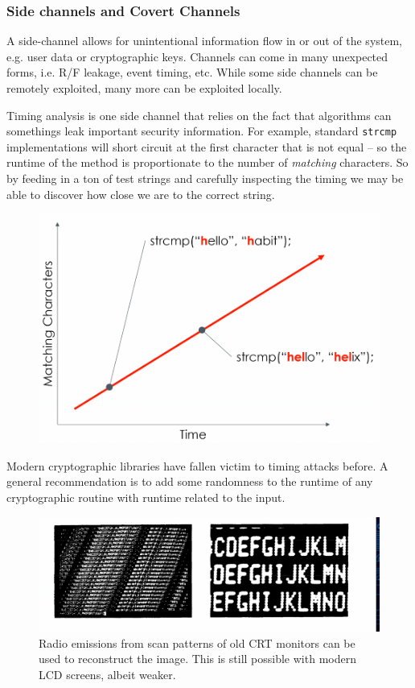 \documentclass[../notes.tex]{subfiles}
\begin{document}
\subsubsection{Side channels and Covert Channels}

\begin{definition}
    A side-channel allows for unintentional information flow in or out of the system, e.g. user data or cryptographic keys.
    Channels can come in many unexpected forms, i.e. R/F leakage, event timing, etc.
    While some side channels can be remotely exploited, many more can be exploited locally.
\end{definition}

Timing analysis is one side channel that relies on the fact that algorithms can somethings leak important security information.
For example, standard \texttt{strcmp} implementations will short circuit at the first character that is not equal -- so the runtime of the method is proportionate to the number of \textit{matching} characters.
So by feeding in a ton of test strings and carefully inspecting the timing we may be able to discover how close we are to the correct string.

\begin{figure}[H]
    \centering
    \includegraphics[width=0.8\linewidth]{img/image_2023-03-28-15-37-17.png}
\end{figure}

Modern cryptographic libraries have fallen victim to timing attacks before. A general recommendation is to add some randomness to the runtime of any cryptographic routine with runtime related to the input.

\begin{figure}[H]
    \centering
    \includegraphics[width=0.8\linewidth]{img/image_2023-03-28-15-44-01.png}
    \caption{Radio emissions from scan patterns of old CRT monitors can be used to reconstruct the image. This is still possible with modern LCD screens, albeit weaker.}
\end{figure}
\end{document}
